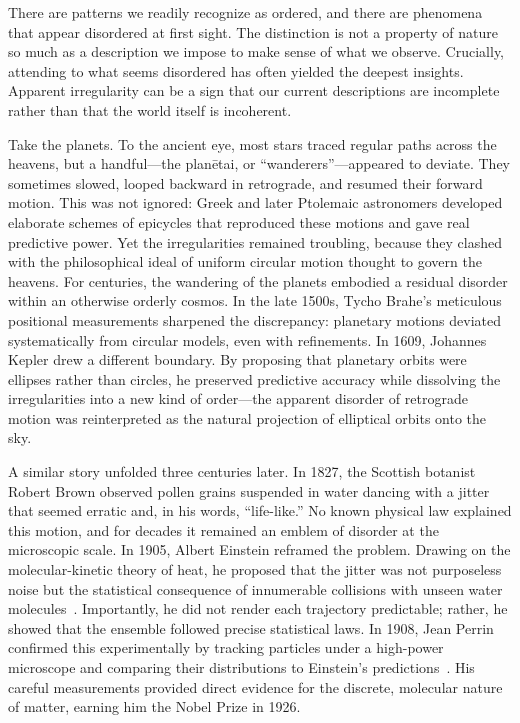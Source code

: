There are patterns we readily recognize as ordered, and there are phenomena that appear disordered at first sight. The distinction is not a property of nature so much as a description we impose to make sense of what we observe. Crucially, attending to what seems disordered has often yielded the deepest insights. Apparent irregularity can be a sign that our current descriptions are incomplete rather than that the world itself is incoherent.

Take the planets. To the ancient eye, most stars traced regular paths across the heavens, but a handful—the planētai, or “wanderers”—appeared to deviate. They sometimes slowed, looped backward in retrograde, and resumed their forward motion. This was not ignored: Greek and later Ptolemaic astronomers developed elaborate schemes of epicycles that reproduced these motions and gave real predictive power. Yet the irregularities remained troubling, because they clashed with the philosophical ideal of uniform circular motion thought to govern the heavens. For centuries, the wandering of the planets embodied a residual disorder within an otherwise orderly cosmos. In the late 1500s, Tycho Brahe’s meticulous positional measurements sharpened the discrepancy: planetary motions deviated systematically from circular models, even with refinements. In 1609, Johannes Kepler drew a different boundary. By proposing that planetary orbits were ellipses rather than circles, he preserved predictive accuracy while dissolving the irregularities into a new kind of order—the apparent disorder of retrograde motion was reinterpreted as the natural projection of elliptical orbits onto the sky.

A similar story unfolded three centuries later. In 1827, the Scottish botanist Robert Brown observed pollen grains suspended in water dancing with a jitter that seemed erratic and, in his words, “life-like.” No known physical law explained this motion, and for decades it remained an emblem of disorder at the microscopic scale. In 1905, Albert Einstein reframed the problem. Drawing on the molecular-kinetic theory of heat, he proposed that the jitter was not purposeless noise but the statistical consequence of innumerable collisions with unseen water molecules~\cite{UberMolekularkinetischenTheorie}. Importantly, he did not render each trajectory predictable; rather, he showed that the ensemble followed precise statistical laws. In 1908, Jean Perrin confirmed this experimentally by tracking particles under a high-power microscope and comparing their distributions to Einstein’s predictions~\cite{r.BrownianMovementMolecular1911}. His careful measurements provided direct evidence for the discrete, molecular nature of matter, earning him the Nobel Prize in 1926.

